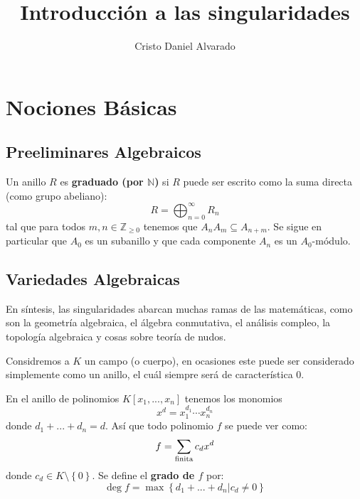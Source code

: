 \documentclass[12pt]{report}
\newcounter{it}
\theoremstyle{largebreak}
\begin{document}
    \setlength{\parskip}{5pt} %
    \setlength{\parindent}{12pt} %
    \title{Introducción a las singularidades}
    \author{Cristo Daniel Alvarado}
    \maketitle

    \tableofcontents %

    \chapter{Nociones Básicas}

    \section{Preeliminares Algebraicos}

    \begin{mydef}
        Un anillo $R$ es \textbf{graduado (por $\mathbb{N}$)} si $R$ puede ser escrito como la suma directa (como grupo abeliano):
        \begin{equation*}
            R=\bigoplus_{ n=0}^\infty R_n
        \end{equation*}
        tal que para todos $m,n\in\mathbb{Z}_{\geq0}$ tenemos que $A_nA_m\subseteq A_{ n+m}$. Se sigue en particular que $A_0$ es un subanillo y que cada componente $A_n$ es un $A_0$-módulo.
    \end{mydef}

    
    
    \section{Variedades Algebraicas}

    En síntesis, las singularidades abarcan muchas ramas de las matemáticas, como son la geometría algebraica, el álgebra conmutativa, el análisis compleo, la topología algebraica y cosas sobre teoría de nudos.
    
    Considremos a $K$ un campo (o cuerpo), en ocasiones este puede ser considerado simplemente como un anillo, el cuál siempre será de característica 0.

    En el anillo de polinomios $K[x_1,...,x_n]$ tenemos los monomios
    \begin{equation*}
        x^d=x_1^{d_1}\cdots x_n^{d_n}
    \end{equation*}
    donde $d_1+...+d_n=d$. Así que todo polinomio $f$ se puede ver como:
    \begin{equation*}
        f=\sum_{\textup{finita}}c_dx^d
    \end{equation*}
    donde $c_d\in K\setminus\left\{0 \right\}$. Se define el \textbf{grado de $f$} por:
    \begin{equation*}
        \deg f=\max\left\{d_1+...+d_n\Big|c_d\neq 0 \right\}
    \end{equation*}
\end{document}
